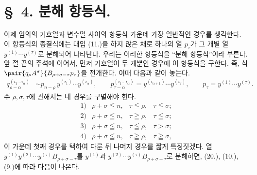 
\section*{\S\ 4. 분해 항등식.}
이제 임의의 기호열과 변수열 사이의 항등식 가운데 가장 일반적인 경우를 생각한다. 이 항등식의 종결식에는 대입 (11.)을 하지 않은 채로 하나의 열 $p_\tau$가 그 개별 열 $y^{(1)}\cdots y^{(\tau)}$로 분해되어 나타난다. 우리는 이러한 항등식을 ``분해 항등식''이라 부른다. 앞 절 끝의 주석에 이어서, 먼저 기호열이 두 개뿐인 경우에 이 항등식을 구한다. 즉, 식 $\pair{q_\rho A^\sigma}{B_{\rho+\sigma-\tau}p_\tau}$을 전개한다. 이때 다음과 같이 놓는다.
\begin{equation}
\begin{aligned}
q_{\rho-\alpha}^{(i_1\ldots i_\alpha)}&\sim p_{n-\rho}\,y^{(i_1)}\cdots y^{(i_\alpha)},\qquad
p_{\tau-\alpha}^{(i_1\ldots i_\alpha)}=y^{(i_{\alpha+1})}\cdots y^{(i_\tau)},\qquad
p_\tau=y^{(1)}\cdots y^{(\tau)}.
\end{aligned}
\tag{22}
\end{equation}
수 $\rho,\sigma,\tau$에 관해서는 네 경우를 구별해야 한다.
\[
\begin{array}{llll}
1)&\rho+\sigma\leqq n,& \tau\leqq\rho,& \tau\leqq\sigma;\\[2pt]
2)&\rho+\sigma\leqq n,& \tau\geqq\rho,& \tau\leqq\sigma;\\[2pt]
3)&\rho+\sigma\leqq n,& \tau\leqq\rho,& \tau>\sigma;\\[2pt]
4)&\rho+\sigma\leqq n,& \tau\geqq\rho,& \tau\geqq\sigma,
\end{array}
\]
이 가운데 첫째 경우를 택하여 다룬 뒤 나머지 경우를 짧게 특징짓겠다. 열 $y^{(1)}y^{(2)}\cdots y^{(\tau)}B_{\rho+\sigma-\tau}$를 $y^{(1)}$과 $y^{(2)}\cdots y^{(\tau)}B_{\rho+\sigma-\tau}$로 분해하면, (20.), (10.), (9.)에 따라 다음이 나온다.
